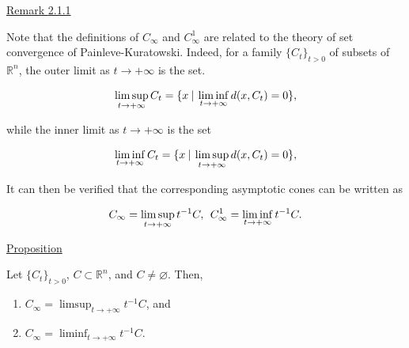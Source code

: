 \documentclass[a4paper,11pt]{jsarticle}
\newcommand{\PROPOSITION}[2]{\begin{itembox}[l]{\underline{Proposition {#1} }}{#2}\end{itembox}}
\newcommand{\REMARK}[2]{\begin{itembox}[l]{\underline{Remark {#1} }}{#2}\end{itembox}}
\newcommand{\NDemenstionalRealEuclidianSpace}{\mathbb{R}^n}
\begin{document}
\REMARK{2.1.1}{
  Note that the definitions of $C_{\infty}$ and $C_{\infty}^1$ are related to the theory of set convergence of Painleve-Kuratowski. Indeed, for a family $\{C_t\}_{t>0}$ of subsets of $\NDemenstionalRealEuclidianSpace$, the outer limit as $t \rightarrow + \infty$ is the set.

  \begin{equation}
    \limsup_{t \to +\infty} C_t = \{x \:|\: \liminf_{t \to +\infty} d(x, C_t) = 0\}, \notag
  \end{equation}

  while the inner limit as $t \rightarrow +\infty$ is the set

  \begin{equation}
    \liminf_{t \to +\infty} C_t = \{x \:|\: \limsup_{t \to +\infty} d(x, C_t) = 0\}, \notag
  \end{equation}

  It can then be verified that the corresponding asymptotic cones can be written as

  \begin{equation}
    C_{\infty} = \limsup_{t \to +\infty} t^{-1} C,\:\: C_{\infty}^1  = \liminf_{t \to +\infty} t^{-1} C. \notag
  \end{equation}
}

\PROPOSITION{}{
  Let $\{C_t\}_{t > 0}$, $C \subset \NDemenstionalRealEuclidianSpace$, and $C \ne \varnothing $. Then,

  \begin{enumerate}
    \item $C_{\infty} = \limsup_{t \to + \infty} t^{-1}C$, and
    \item $C_{\infty} = \liminf_{t \to + \infty} t^{-1}C$.
  \end{enumerate}
}
\end{document}
